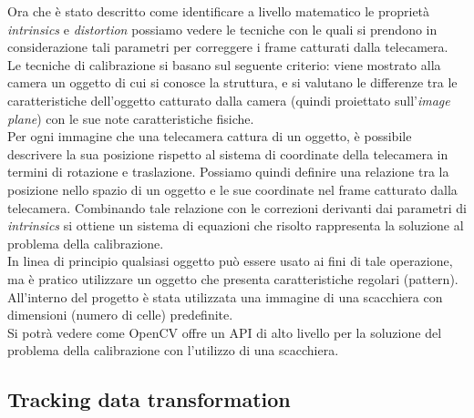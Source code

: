 Ora che è stato descritto come identificare a livello matematico le proprietà \textit{intrinsics} e \textit{distortion} possiamo vedere le tecniche con le quali si prendono in considerazione tali parametri per correggere i frame catturati dalla telecamera.\\
Le tecniche di calibrazione si basano sul seguente criterio: viene mostrato alla camera un oggetto di cui si conosce la struttura, e si valutano le differenze tra le caratteristiche dell'oggetto catturato dalla camera (quindi proiettato sull'\textit{image plane}) con le sue note caratteristiche fisiche. \\Per ogni immagine che una telecamera cattura di un oggetto, è possibile descrivere la sua posizione rispetto al sistema di coordinate della telecamera in termini di rotazione e traslazione. Possiamo quindi definire una relazione tra la posizione nello spazio di un oggetto e le sue coordinate nel frame catturato dalla telecamera. Combinando tale relazione con le correzioni derivanti dai parametri di \textit{intrinsics} si ottiene un sistema di equazioni che risolto rappresenta la soluzione al problema della calibrazione.\\
In linea di principio qualsiasi oggetto può essere usato ai fini di tale operazione, ma è pratico utilizzare un oggetto che presenta caratteristiche regolari (pattern). All'interno del progetto è stata  utilizzata una immagine di una scacchiera con dimensioni (numero di celle) predefinite.  \\
Si potrà vedere come OpenCV offre un API di alto livello per la soluzione del problema della calibrazione con l'utilizzo di una scacchiera.

\subsection{Tracking data transformation}

